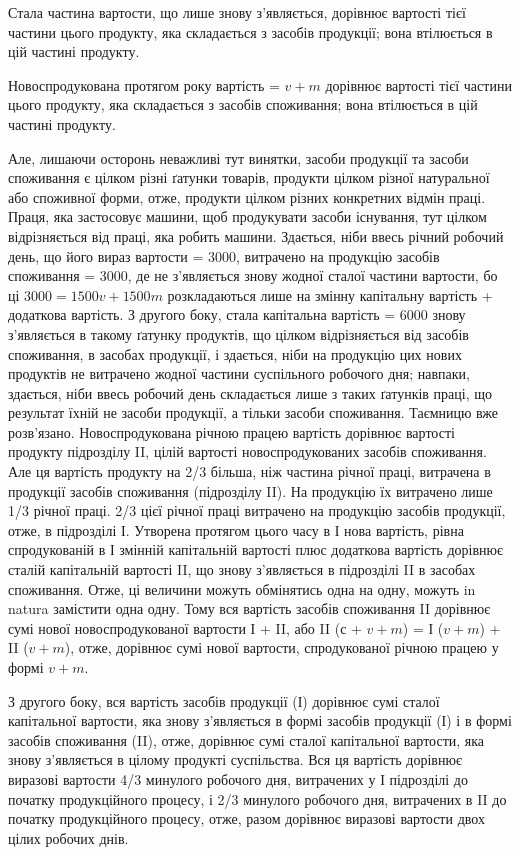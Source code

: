 Стала частина вартости, що лише знову з’являється, дорівнює вартості
тієї частини цього продукту, яка складається з засобів продукції;
вона втілюється в цій частині продукту.

Новоспродукована протягом року вартість = $v + m$ дорівнює вартості
тієї частини цього продукту, яка складається з засобів споживання;
вона втілюється в цій частині продукту.

Але, лишаючи осторонь неважливі тут винятки, засоби продукції та
засоби споживання є цілком різні ґатунки товарів, продукти цілком різної
натуральної або споживної форми, отже, продукти цілком різних конкретних
відмін праці. Праця, яка застосовує машини, щоб продукувати
засоби існування, тут цілком відрізняється від праці, яка робить машини.
Здається, ніби ввесь річний робочий день, що його вираз вартости = 3000,
витрачено на продукцію засобів споживання = 3000, де не з’являється
знову жодної сталої частини вартости, бо ці $3000 = 1500 v + 1500 m$
розкладаються лише на змінну капітальну вартість + додаткова вартість. З
другого боку, стала капітальна вартість = 6000 знову з’являється в такому
ґатунку продуктів, що цілком відрізняється від засобів споживання,
в засобах продукції, і здається, ніби на продукцію цих нових продуктів
не витрачено жодної частини суспільного робочого дня; навпаки, здається,
ніби ввесь робочий день складається лише з таких ґатунків праці, що
результат їхній не засоби продукції, а тільки засоби споживання. Таємницю
вже розв’язано. Новоспродукована річною працею вартість дорівнює
вартості продукту підрозділу II, цілій вартості новоспродукованих засобів
споживання. Але ця вартість продукту на 2/3 більша, ніж частина річної
праці, витрачена в продукції засобів споживання (підрозділу II). На продукцію
їх витрачено лише 1/3 річної праці. 2/3 цієї річної праці витрачено
на продукцію засобів продукції, отже, в підрозділі І. Утворена протягом
цього часу в І нова вартість, рівна спродукованій в І змінній капітальній
вартості плюс додаткова вартість дорівнює сталій капітальній вартості II,
що знову з’являється в підрозділі II в засобах споживання. Отже, ці величини
можуть обмінятись одна на одну, можуть in natura замістити одна одну.
Тому вся вартість засобів споживання II дорівнює сумі нової новоспродукованої
вартости І + II, або II (с + $v + m$) = І ($v + m$) + II ($v + m$), отже, дорівнює
сумі нової вартости, спродукованої річною працею у формі $v + m$.

З другого боку, вся вартість засобів продукції (І) дорівнює сумі сталої
капітальної вартости, яка знову з’являється в формі засобів продукції
(І) і в формі засобів споживання (II), отже, дорівнює сумі сталої
капітальної вартости, яка знову з’являється в цілому продукті суспільства.
Вся ця вартість дорівнює виразові вартости 4/3 минулого робочого дня,
витрачених у І підрозділі до початку продукційного процесу, і 2/3
минулого робочого дня, витрачених в II до початку продукційного процесу,
отже, разом дорівнює виразові вартости двох цілих робочих днів.

